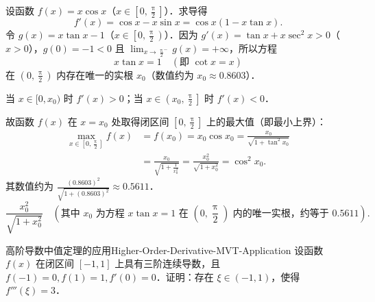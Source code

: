 \begin{solution}
    设函数 $f(x) = x \cos x$（$x \in \left[0, \frac{\uppi}{2}\right]$）．求导得
    \begin{equation}
        f'(x) = \cos x - x \sin x = \cos x (1 - x \tan x).
    \end{equation}
    令 $g(x) = x \tan x - 1$（$x \in \left[0, \frac{\uppi}{2}\right)$）．因为 $g'(x) = \tan x + x\sec^2 x > 0$（$x > 0$），$g(0) = -1 < 0$ 且 $\lim_{x\to \frac{\uppi}{2}^-} g(x) = +\infty$，所以方程
    \begin{equation}
        x \tan x = 1 \quad \left(\text{即 } \cot x = x\right)
    \end{equation}
    在 $\left(0, \frac{\uppi}{2}\right)$ 内存在唯一的实根 $x_0$（数值约为 $x_0 \approx 0.8603$）．

    当 $x \in [0, x_0)$ 时 $f'(x) > 0$；当 $x \in \left(x_0, \frac{\uppi}{2}\right]$ 时 $f'(x) < 0$．

    故函数 $f(x)$ 在 $x = x_0$ 处取得闭区间 $\left[0, \frac{\uppi}{2}\right]$ 上的最大值（即最小上界）：
    \begin{equation}
        \begin{aligned}
            \max_{x\in\left[0, \frac{\uppi}{2}\right]} f(x) & = f(x_0) = x_0 \cos x_0 = \frac{x_0}{\sqrt{1 + \tan^2 x_0}}                             \\
                                                            & = \frac{x_0}{\sqrt{1 + \frac{1}{x_0^2}}} = \frac{x_0^2}{\sqrt{1 + x_0^2}} = \cos^2 x_0.
        \end{aligned}
    \end{equation}
    其数值约为 $\frac{(0.8603)^2}{\sqrt{1 + (0.8603)^2}} \approx 0.5611$．
    \begin{equation}
        \boxed{\frac{x_0^2}{\sqrt{1 + x_0^2}} \quad \left(\text{其中 } x_0 \text{ 为方程 } x \tan x = 1 \text{ 在 } \left(0, \frac{\uppi}{2}\right) \text{ 内的唯一实根，约等于 } 0.5611\right).}
    \end{equation}
\end{solution}

\begin{problem}{高阶导数中值定理的应用}{Higher-Order-Derivative-MVT-Application}
    设函数 $f(x)$ 在闭区间 $[-1, 1]$ 上具有三阶连续导数，且 $f(-1) = 0, f(1) = 1, f'(0) = 0$．证明：存在 $\xi \in (-1, 1)$，使得 $f'''(\xi) = 3$．
\end{problem}

